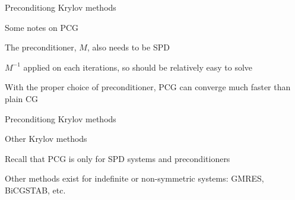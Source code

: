 \documentclass[18pt,xcolor=table]{beamer}
\begin{document}
\begin{frame}{Preconditiong Krylov methods}
\begin{block}{Some notes on PCG}
\bit
\item The preconditioner, $M$, also needs to be SPD
\item $M^{-1}$ applied on each iterations, so should be relatively easy to solve
\item With the proper choice of preconditioner, PCG can converge much faster than plain CG
\eit
\end{block}
\end{frame}

\begin{frame}{Preconditiong Krylov methods}
\begin{block}{Other Krylov methods}
\bit
\item Recall that PCG is only for SPD systems and preconditioners
\item Other methods exist for indefinite or non-symmetric systems: GMRES, BiCGSTAB, etc.
\eit
\end{block}
\end{frame}

\end{document}
